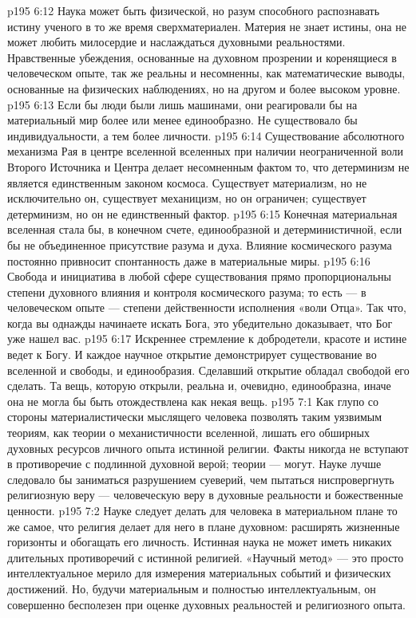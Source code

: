 \vs p195 6:12 Наука может быть физической, но разум способного распознавать истину ученого в то же время сверхматериален. Материя не знает истины, она не может любить милосердие и наслаждаться духовными реальностями. Нравственные убеждения, основанные на духовном прозрении и коренящиеся в человеческом опыте, так же реальны и несомненны, как математические выводы, основанные на физических наблюдениях, но на другом и более высоком уровне.
\vs p195 6:13 Если бы люди были лишь машинами, они реагировали бы на материальный мир более или менее единообразно. Не существовало бы индивидуальности, а тем более личности.
\vs p195 6:14 \pc Существование абсолютного механизма Рая в центре вселенной вселенных при наличии неограниченной воли Второго Источника и Центра делает несомненным фактом то, что детерминизм не является единственным законом космоса. Существует материализм, но не исключительно он, существует механицизм, но он ограничен; существует детерминизм, но он не единственный фактор.
\vs p195 6:15 Конечная материальная вселенная стала бы, в конечном счете, единообразной и детерминистичной, если бы не объединенное присутствие разума и духа. Влияние космического разума постоянно привносит спонтанность даже в материальные миры.
\vs p195 6:16 Свобода и инициатива в любой сфере существования прямо пропорциональны степени духовного влияния и контроля космического разума; то есть --- в человеческом опыте --- степени действенности исполнения «воли Отца». Так что, когда вы однажды начинаете искать Бога, это убедительно доказывает, что Бог уже нашел вас.
\vs p195 6:17 Искреннее стремление к добродетели, красоте и истине ведет к Богу. И каждое научное открытие демонстрирует существование во вселенной и свободы, и единообразия. Сделавший открытие обладал свободой его сделать. Та вещь, которую открыли, реальна и, очевидно, единообразна, иначе она не могла бы быть отождествлена как некая вещь.
\vs p195 7:1 Как глупо со стороны материалистически мыслящего человека позволять таким уязвимым теориям, как теории о механистичности вселенной, лишать его обширных духовных ресурсов личного опыта истинной религии. Факты никогда не вступают в противоречие с подлинной духовной верой; теории --- могут. Науке лучше следовало бы заниматься разрушением суеверий, чем пытаться ниспровергнуть религиозную веру --- человеческую веру в духовные реальности и божественные ценности.
\vs p195 7:2 Науке следует делать для человека в материальном плане то же самое, что религия делает для него в плане духовном: расширять жизненные горизонты и обогащать его личность. Истинная наука не может иметь никаких длительных противоречий с истинной религией. «Научный метод» --- это просто интеллектуальное мерило для измерения материальных событий и физических достижений. Но, будучи материальным и полностью интеллектуальным, он совершенно бесполезен при оценке духовных реальностей и религиозного опыта.
